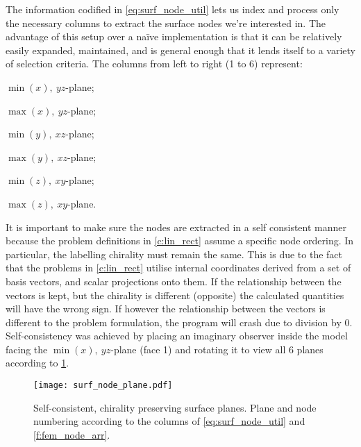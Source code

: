 The information codified in \cref{eq:surf_node_util} lets us index and process only the necessary columns to extract the surface nodes we're interested in. The advantage of this setup over a naïve implementation is that it can be relatively easily expanded, maintained, and is general enough that it lends itself to a variety of selection criteria. The columns from left to right (1 to 6) represent:
\begin{inparaenum}
	\item $ \min(x),~ yz $-plane;
	\item $ \max(x),~ yz $-plane;
	\item $ \min(y),~ xz $-plane;
	\item $ \max(y),~ xz $-plane;
	\item $ \min(z),~ xy $-plane;
	\item $ \max(z),~ xy $-plane.
\end{inparaenum}

It is important to make sure the nodes are extracted in a self consistent manner because the problem definitions in \cref{c:lin_rect} assume a specific node ordering. In particular, the labelling chirality must remain the same. This is due to the fact that the problems in \cref{c:lin_rect} utilise internal coordinates derived from a set of basis vectors, and scalar projections onto them. If the relationship between the vectors is kept, but the chirality is different (opposite) the calculated quantities will have the wrong sign. If however the relationship between the vectors is different to the problem formulation, the program will crash due to division by 0. Self-consistency was achieved by placing an imaginary observer inside the  model facing the $ \min(x),~ yz $-plane (face 1) and rotating it to view all 6 planes according to \cref{f:surf_node_plane}.
\begin{figure}
	\centering
	\texttt{[image: surf\_node\_plane.pdf]}
	\caption[Self-consistent, chirality preserving surface planes.]{Self-consistent, chirality preserving surface planes. Plane and node numbering according to the columns of \cref{eq:surf_node_util} and \cref{f:fem_node_arr}.}
	\label{f:surf_node_plane}
\end{figure}
